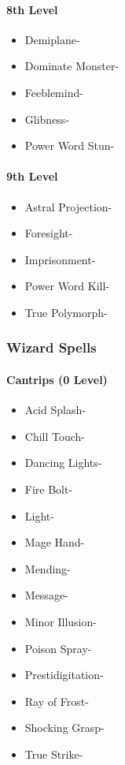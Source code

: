 \documentclass[
]{article}
\providecommand{\tightlist}{%
  \setlength{\itemsep}{0pt}\setlength{\parskip}{0pt}}
\begin{document}
\hypertarget{8th-level-4}{%
\paragraph{8th Level}\label{8th-level-4}}

\begin{itemize}
\tightlist
\item
  Demiplane-
\item
  Dominate Monster-
\item
  Feeblemind-
\item
  Glibness-
\item
  Power Word Stun-
\end{itemize}

\hypertarget{9th-level-4}{%
\paragraph{9th Level}\label{9th-level-4}}

\begin{itemize}
\tightlist
\item
  Astral Projection-
\item
  Foresight-
\item
  Imprisonment-
\item
  Power Word Kill-
\item
  True Polymorph-
\end{itemize}

\hypertarget{wizard-spells}{%
\subsubsection{Wizard Spells}\label{wizard-spells}}

\hypertarget{cantrips-0-level-5}{%
\paragraph{Cantrips (0 Level)}\label{cantrips-0-level-5}}

\begin{itemize}
\tightlist
\item
  Acid Splash-
\item
  Chill Touch-
\item
  Dancing Lights-
\item
  Fire Bolt-
\item
  Light-
\item
  Mage Hand-
\item
  Mending-
\item
  Message-
\item
  Minor Illusion-
\item
  Poison Spray-
\item
  Prestidigitation-
\item
  Ray of Frost-
\item
  Shocking Grasp-
\item
  True Strike-
\end{itemize}
\end{document}
